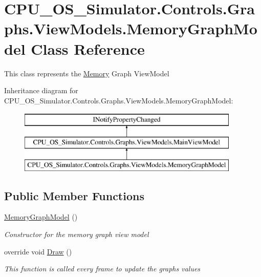\hypertarget{class_c_p_u___o_s___simulator_1_1_controls_1_1_graphs_1_1_view_models_1_1_memory_graph_model}{}\section{C\+P\+U\+\_\+\+O\+S\+\_\+\+Simulator.\+Controls.\+Graphs.\+View\+Models.\+Memory\+Graph\+Model Class Reference}
\label{class_c_p_u___o_s___simulator_1_1_controls_1_1_graphs_1_1_view_models_1_1_memory_graph_model}


This class represents the \hyperlink{namespace_c_p_u___o_s___simulator_1_1_memory}{Memory} Graph View\+Model  


Inheritance diagram for C\+P\+U\+\_\+\+O\+S\+\_\+\+Simulator.\+Controls.\+Graphs.\+View\+Models.\+Memory\+Graph\+Model\+:\begin{figure}[H]
\begin{center}
\leavevmode
\includegraphics[height=3.000000cm]{class_c_p_u___o_s___simulator_1_1_controls_1_1_graphs_1_1_view_models_1_1_memory_graph_model}
\end{center}
\end{figure}
\subsection*{Public Member Functions}
\begin{DoxyCompactItemize}
\item 
\hyperlink{class_c_p_u___o_s___simulator_1_1_controls_1_1_graphs_1_1_view_models_1_1_memory_graph_model_a5c4aa222d00594fbf03399f968f834d1}{Memory\+Graph\+Model} ()
\begin{DoxyCompactList}\small\item\em Constructor for the memory graph view model \end{DoxyCompactList}\item 
override void \hyperlink{class_c_p_u___o_s___simulator_1_1_controls_1_1_graphs_1_1_view_models_1_1_memory_graph_model_a5bcfa1355be7ffa67fd8185d66d948d6}{Draw} ()
\begin{DoxyCompactList}\small\item\em This function is called every frame to update the graph\textquotesingle{}s values \end{DoxyCompactList}\end{DoxyCompactItemize}
